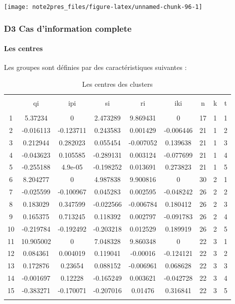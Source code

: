 \documentclass[11pt,]{article}
\let\oldparagraph\paragraph
\renewcommand{\paragraph}[1]{\oldparagraph{#1}\mbox{}}
\begin{document}
\begin{center}\texttt{[image: note2pres\_files/figure-latex/unnamed-chunk-96-1]} \end{center}

\hypertarget{d3-cas-dinformation-complete}{%
\subsubsection{D3 Cas d'information
complete}\label{d3-cas-dinformation-complete}}

\hypertarget{les-centres-1}{%
\paragraph{Les centres}\label{les-centres-1}}

Les groupes sont définies par des caractéristiques suivantes :

\FloatBarrier

\begin{table}[!htbp] \centering 
  \caption{Les centres des clusters} 
  \label{} 
\begin{tabular}{@{\extracolsep{5pt}} ccccccccc} 
\\[-1.8ex]\hline 
\hline \\[-1.8ex] 
 & qi & ipi & si & ri & iki & n & k & t \\ 
\hline \\[-1.8ex] 
1 & 5.37234 & 0 & 2.473289 & 9.869431 & 0 & 17 & 1 & 1 \\ 
2 & -0.016113 & -0.123711 & 0.243583 & 0.001429 & -0.006446 & 21 & 1 & 2 \\ 
3 & 0.212944 & 0.282023 & 0.055454 & -0.007052 & 0.139638 & 21 & 1 & 3 \\ 
4 & -0.043623 & 0.105585 & -0.289131 & 0.003124 & -0.077699 & 21 & 1 & 4 \\ 
5 & -0.255188 & 4.9e-05 & -0.198252 & 0.013691 & 0.273823 & 21 & 1 & 5 \\ 
6 & 8.204277 & 0 & 4.987838 & 9.900816 & 0 & 30 & 2 & 1 \\ 
7 & -0.025599 & -0.100967 & 0.045283 & 0.002595 & -0.048242 & 26 & 2 & 2 \\ 
8 & 0.183029 & 0.347599 & -0.022566 & -0.006784 & 0.180412 & 26 & 2 & 3 \\ 
9 & 0.165375 & 0.713245 & 0.118392 & 0.002797 & -0.091783 & 26 & 2 & 4 \\ 
10 & -0.219784 & -0.192492 & -0.203218 & 0.012529 & 0.189919 & 26 & 2 & 5 \\ 
11 & 10.905002 & 0 & 7.048328 & 9.860348 & 0 & 22 & 3 & 1 \\ 
12 & 0.084361 & 0.004019 & 0.119041 & -0.00016 & -0.124121 & 22 & 3 & 2 \\ 
13 & 0.172876 & 0.23654 & 0.088152 & -0.006961 & 0.068628 & 22 & 3 & 3 \\ 
14 & -0.001697 & 0.12228 & -0.165249 & 0.003621 & -0.042728 & 22 & 3 & 4 \\ 
15 & -0.383271 & -0.170071 & -0.207016 & 0.01476 & 0.316841 & 22 & 3 & 5 \\ 
\hline \\[-1.8ex] 
\end{tabular} 
\end{table}
\end{document}
